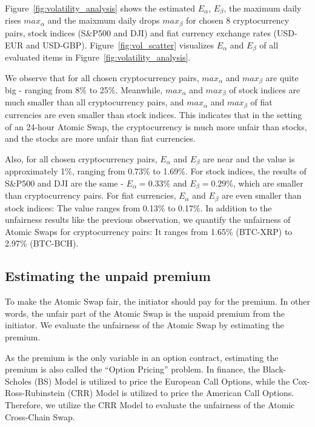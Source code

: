 Figure~\ref{fig:volatility_analysis} shows the estimated $E_\alpha$, $E_\beta$, the maximum daily rises $max_\alpha$ and the maixmum daily drops $max_\beta$ for chosen 8 cryptocurrency pairs, stock indices (S\&P500 and DJI) and fiat currency exchange rates (USD-EUR and USD-GBP).
Figure~\ref{fig:vol_scatter} visualizes $E_\alpha$ and $E_\beta$ of all evaluated items in Figure~\ref{fig:volatility_analysis}.

We observe that for all chosen cryptocurrency pairs, $max_\alpha$ and $max_\beta$ are quite big - ranging from 8\% to 25\%.
Meanwhile, $max_\alpha$ and $max_\beta$ of stock indices are much smaller than all cryptocurrency pairs,
and $max_\alpha$ and $max_\beta$ of fiat currencies are even smaller than stock indices.
This indicates that in the setting of an 24-hour Atomic Swap, the cryptocurrency is much more unfair than stocks, and the stocks are more unfair than fiat currencies.

Also, for all chosen cryptocurrency pairs, $E_{\alpha}$ and $E_{\beta}$ are near and the value is approximately 1\%, ranging from 0.73\% to 1.69\%.
For stock indices, the results of S\&P500 and DJI are the same - $E_\alpha = 0.33\%$ and $E_\beta = 0.29\%$, which are smaller than cryptocurrency pairs.
For fiat currencies, $E_\alpha$ and $E_\beta$ are even smaller than stock indices: The value ranges from 0.13\% to 0.17\%.
In addition to the unfairness results like the previous observation, we quantify the unfairness of Atomic Swaps for cryptocurrency pairs: It ranges from  1.65\% (BTC-XRP) to 2.97\% (BTC-BCH).



















\subsection{Estimating the unpaid premium}

To make the Atomic Swap fair, the initiator should pay for the premium.
In other words, the unfair part of the Atomic Swap is the unpaid premium from the initiator.
We evaluate the unfairness of the Atomic Swap by estimating the premium.

As the premium is the only variable in an option contract, estimating the premium is also called the ``Option Pricing'' problem.
In finance, the Black-Scholes (BS) Model is utilized to price the European Call Options,
while the Cox-Ross-Rubinstein (CRR) Model is utilized to price the American Call Options.
Therefore, we utilize the CRR Model to evaluate the unfairness of the Atomic Cross-Chain Swap.

